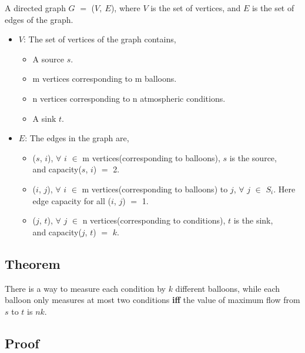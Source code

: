 \documentclass[pdftex,a4paper,12pt]{report}
\begin{document}
A directed graph $G$ $=$ ($V,\ E$), where $V$ is the set of vertices, and $E$ is the set of edges of the graph.

\begin{itemize}
 \item \underline{\textbf{$V$}}: The set of vertices of the graph contains,
     \begin{itemize}
     \item A source $s$.
     \item m vertices corresponding to m balloons.
     \item n vertices corresponding to n atmospheric conditions.
     \item A sink $t$.
     \end{itemize}
 \item \underline{\textbf{$E$}}: The edges in the graph are,
     \begin{itemize}
     \item ($s$, $i$), $\forall$ $i$ $\in$ m vertices(corresponding to balloons), $s$ is the source,\\and capacity($s$, $i$) $=$ 2.
     \item ($i$, $j$), $\forall$ $i$ $\in$ m vertices(corresponding to balloons) to $j$, $\forall$ $j$ $\in$ $S_i$. Here edge capacity for all ($i$, $j$) $=$ 1.
     \item ($j$, $t$), $\forall$ $j$ $\in$ n vertices(corresponding to conditions), $t$ is the sink,\\and capacity($j$, $t$) $=$ $k$.
     \end{itemize}
\end{itemize}

\subsection{Theorem}

There is a way to measure each condition by $k$ different balloons, while each balloon only measures at most two conditions \textbf{iff} the value of maximum flow from $s$ to $t$ is $nk$.

\subsection{Proof}
\end{document}
